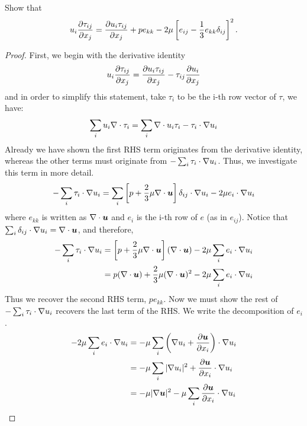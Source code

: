 \documentclass{article}
\begin{document}
Show that 
\begin{gather*}
    u_i\frac{\partial \tau_{ij}}{\partial x_j} = \frac{\partial u_i\tau_{ij}}{\partial x_j} + pe_{kk} -
    2\mu\left[e_{ij} - \frac{1}{3}e_{kk}\delta_{ij}\right]^2. 
\end{gather*}

\begin{proof}
    First, we begin with the derivative identity
    \begin{gather*}
        u_i\frac{\partial \tau_{ij}}{\partial x_j} = \frac{\partial u_i\tau_{ij}}{\partial x_j} - \tau_{ij}\frac{\partial u_i}{\partial x_j}
    \end{gather*}
    and in order to simplify this statement, take $\tau_i$ to be the i-th row
    vector of $\tau$, we have:
    \begin{gather*}
        \sum_i u_i\nabla \cdot{\tau_i} = \sum_i\nabla \cdot{u_i\tau_i} - \tau_i\cdot\nabla u_i
    \end{gather*}
    Already we have shown the first RHS term originates from the derivative
    identity, whereas the other terms must originate from
    $-\sum_i\tau_i\cdot\nabla u_i$. Thus, we investigate this term in more
    detail. 
    \begin{gather*}
        -\sum_i\tau_i\cdot\nabla u_i =\sum_i \left[p +
        \frac{2}{3}\mu\nabla\cdot\boldsymbol{u}\right]\delta_{ij}\cdot\nabla u_i - 2\mu
        e_i\cdot\nabla u_i
    \end{gather*}
    where $e_{kk}$ is written as $\nabla\cdot\boldsymbol{u}$ and $e_i$ is the i-th row of
    $e$ (as in $e_{ij}$). Notice that $\sum_{i}\delta_{ij}\cdot\nabla u_i =
    \nabla\cdot\boldsymbol{u}$, and therefore, 
    \begin{align*}
         -\sum_i\tau_i\cdot\nabla u_i &= \left[p +
        \frac{2}{3}\mu\nabla\cdot\boldsymbol{u}\right](\nabla\cdot\boldsymbol{u}) - 2\mu
        \sum_ie_i\cdot\nabla u_i\\
        &= p(\nabla \cdot{\boldsymbol{u}}) + \frac{2}{3}\mu(\nabla \cdot{\boldsymbol{u}})^2 - 2\mu
        \sum_ie_i\cdot\nabla u_i
    \end{align*}
    Thus we recover the second RHS term, $pe_{kk}$. Now we must show the rest of
    $-\sum_i\tau_i\cdot\nabla u_i$ recovers the last term of the RHS. We write
    the decomposition of $e_{i}$. 
    \begin{align*}
        -2\mu\sum_ie_i\cdot\grad u_i &= -\mu\sum_i \left(\grad u_i +
        \ppxi{\uvec}\right)\cdot\grad u_i\\
        &= -\mu \sum_i |\grad u_i|^2 + \ppxi{\uvec}\cdot\grad u_i\\
        &= -\mu |\grad\uvec|^2 - \mu\sum_i \ppxi{\uvec}\cdot\grad u_i\\

\end{align*}
\end{proof}
\end{document}
